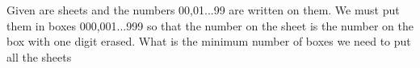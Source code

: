 Given are sheets and the numbers 00,01...99 are written on them. We must put them in boxes 000,001...999 so that the number on the sheet  is the number on the box with one digit erased. What is the minimum number of boxes we need to put all the sheets